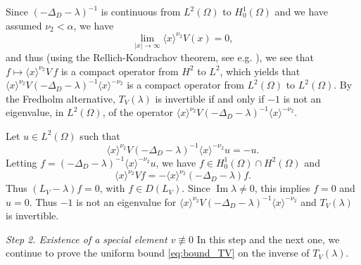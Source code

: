 \documentclass[10pt,leqno]{amsart}
\DeclareMathOperator{\im}{Im} %
\theoremstyle{definition}%
\theoremstyle{remark}
\numberwithin{equation}{section}
\renewcommand{\^}{\widehat}%
\begin{document}
Since $ (-\Delta_D-\lambda)^{-1}$ is continuous from $L^2(\Omega)$ to $H^{1}_0(\Omega)$ and we have assumed $\nu_2<\alpha$, we have 
$$ \lim_{|x|\to\infty} \langle x\rangle^{\nu_2}V(x)=0,$$
and thus (using the Rellich-Kondrachov theorem, see e.g. \cite[Subsection 5.7]{Evans10Bo}), we see that $f\mapsto \langle x \rangle^{\nu_2}V\,f$ is a compact operator from $H^2$ to $L^2$, which yields that
$\langle x\rangle^{\nu_2} V\left(-\Delta_D-\lambda\right)^{-1}\langle x\rangle^{-\nu_2}$ is a compact operator from $L^2(\Omega)$ to $L^2(\Omega)$. By the Fredholm alternative, $T_V(\lambda)$ is invertible if and only if $-1$ is not an eigenvalue, in $L^2(\Omega)$, of the operator $\langle x\rangle^{\nu_2} V\left(-\Delta_D-\lambda\right)^{-1}\langle x\rangle^{-\nu_2}$. 

Let $u\in L^2(\Omega)$ such that
$$ \langle x\rangle^{\nu_2} V\left(-\Delta_D-\lambda\right)^{-1}\langle x\rangle^{-\nu_2}u=-u.$$
Letting $f=(-\Delta_D-\lambda)^{-1}\langle x\rangle^{-\nu_2} u$, we have $f\in H^1_0(\Omega)\cap H^2(\Omega)$ and
$$ \langle x\rangle^{\nu_2} V f=-\langle x\rangle^{\nu_2} (-\Delta_D-\lambda)f.$$
Thus $(L_V-\lambda)f=0$, with $f\in D(L_V)$. Since $\im \lambda\neq 0$, this implies $f=0$ and $u=0$. Thus $-1$ is not an eigenvalue for $\langle x\rangle^{\nu_2} V\left(-\Delta_D-\lambda\right)^{-1}\langle x\rangle^{-\nu_2}$ and $T_V(\lambda)$ is invertible.

\medskip

\noindent\emph{Step 2. Existence of a special element $v\not\equiv 0$ } In this step and the next one, we continue to prove the uniform bound \eqref{eq:bound_TV} on the inverse of $T_V(\lambda)$. 
 
\end{document}
